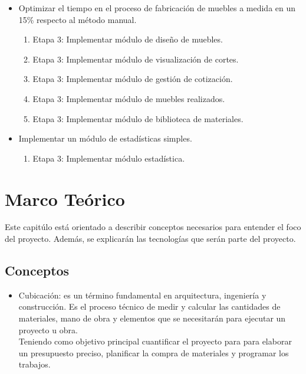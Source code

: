 \documentclass[12pt,oneside]{article}
\begin{document}
\begin{itemize}
\item Optimizar el tiempo en el proceso de fabricación de muebles a medida en un 15\% respecto al método manual.  
\begin{enumerate}
\item Etapa 3: Implementar módulo de diseño de muebles.
\item Etapa 3: Implementar módulo de visualización de cortes.
\item Etapa 3: Implementar módulo de gestión de cotización.
\item Etapa 3: Implementar módulo de muebles realizados.
\item Etapa 3: Implementar módulo de biblioteca de materiales.
\end{enumerate}

\item Implementar un módulo de estadísticas simples.
\begin{enumerate}
\item Etapa 3: Implementar módulo estadística.
\end{enumerate}
\end{itemize}

\section{Marco Teórico}
Este capitúlo está orientado a describir conceptos necesarios para entender el foco del proyecto. Además, se explicarán las tecnologías que serán parte del proyecto.

\subsection{Conceptos}
\begin{itemize}
    \item Cubicación: es un término fundamental en arquitectura, ingeniería y construcción. Es el proceso técnico de medir y calcular las cantidades de materiales, mano de obra y elementos que se necesitarán para ejecutar un proyecto u obra.\\
    Teniendo como objetivo principal cuantificar el proyecto para para elaborar un presupuesto preciso, planificar la compra de materiales y programar los trabajos.
\end{itemize}
\end{document}
